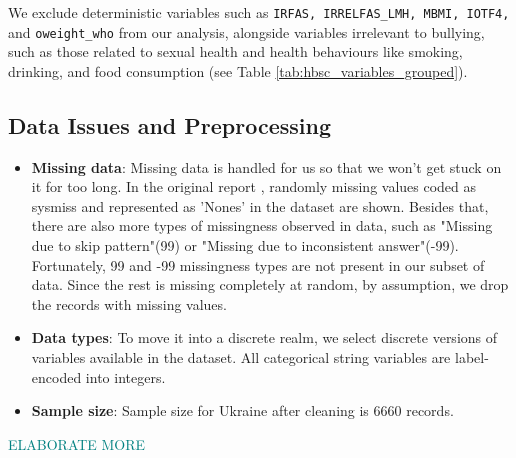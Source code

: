 \documentclass[main.tex]{subfiles}
\begin{document}
We exclude deterministic variables such as \texttt{IRFAS, IRRELFAS\_LMH, MBMI, IOTF4,} and \texttt{oweight\_who} from our analysis, alongside variables irrelevant to bullying, such as those related to sexual health and health behaviours like smoking, drinking, and food consumption (see Table \ref{tab:hbsc_variables_grouped}).


% 

% 



% 

\subsection{Data Issues and Preprocessing}
\begin{itemize}
  \item \textbf{Missing data}: 
  Missing data is handled for us so that we won't get stuck on it for too long. In the original report \cite{HBSC2018OA_ed1}, randomly missing values coded as sysmiss and represented as 'Nones' in the dataset are shown. Besides that, there are also more types of missingness observed in data, such as "Missing due to skip pattern"(99) or "Missing due to inconsistent answer"(-99). Fortunately, 99 and -99 missingness types are not present in our subset of data. Since the rest is missing completely at random, by assumption, we drop the records with missing values.
  \item \textbf{Data types}: To move it into a discrete realm, we select discrete versions of variables available in the dataset. All categorical string variables are label-encoded into integers. 
  \item \textbf{Sample size}: Sample size for Ukraine after cleaning is 6660 records. 
\end{itemize}

\textcolor{teal}{ELABORATE MORE}

\end{document}
